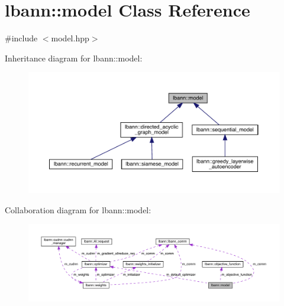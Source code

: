 \hypertarget{classlbann_1_1model}{}\section{lbann\+:\+:model Class Reference}
\label{classlbann_1_1model}


{\ttfamily \#include $<$model.\+hpp$>$}



Inheritance diagram for lbann\+:\+:model\+:\nopagebreak
\begin{figure}[H]
\begin{center}
\leavevmode
\includegraphics[width=350pt]{classlbann_1_1model__inherit__graph}
\end{center}
\end{figure}


Collaboration diagram for lbann\+:\+:model\+:\nopagebreak
\begin{figure}[H]
\begin{center}
\leavevmode
\includegraphics[width=350pt]{classlbann_1_1model__coll__graph}
\end{center}
\end{figure}
